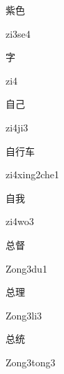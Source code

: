 \begin{verbete}[zi3se4]{紫色}
\begin{pronuncia}{zi3se4}
\end{pronuncia}
\end{verbete}

\begin{verbete}[zi4]{字}
\begin{pronuncia}{zi4}
\end{pronuncia}
\end{verbete}

\begin{verbete}[zi4ji3]{自己}
\begin{pronuncia}{zi4ji3}
\end{pronuncia}
\end{verbete}

\begin{verbete}{自行车}
\begin{pronuncia}{zi4xing2che1}
\end{pronuncia}
\end{verbete}

\begin{verbete}[zi4wo3]{自我}
\begin{pronuncia}{zi4wo3}
\end{pronuncia}
\end{verbete}

\begin{verbete}[Zong3du1]{总督}
\begin{pronuncia}{Zong3du1}
\end{pronuncia}
\end{verbete}

\begin{verbete}[Zong3li3]{总理}
\begin{pronuncia}{Zong3li3}
\end{pronuncia}
\end{verbete}

\begin{verbete}{总统}
\begin{pronuncia}{Zong3tong3}
\end{pronuncia}
\end{verbete}

